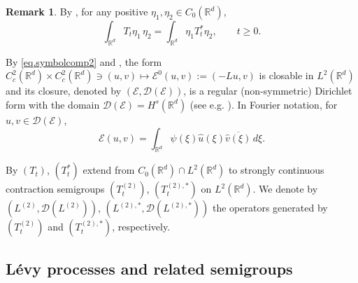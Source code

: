 \documentclass[11pt,a4paper,reqno]{amsart}
\newcommand{\EE}{{\mathcal  E}}
\theoremstyle{definition}
\newtheorem{remark}[theorem]{Remark}
\numberwithin{equation}{section}
\begin{document}
\begin{remark}
\label{rem.adj}
By \cite[Proposition II.1]{Bertoin}, for any positive $\eta_1, \eta_2 \in C_0(\mathbb R^d)$,
\begin{equation}
\label{eq.dual}
\int_{\mathbb{R}^d} T_t \eta_1 \, \eta_2 = \int_{\mathbb{R}^d} \eta_1 T^*_t \eta_2, \qquad t \geq 0.
\end{equation}
\end{remark}











By \eqref{eq.symbolcomp2} and  \cite[Theorem 3.7]{BF}, the form $C^2_c(\mathbb R^d)\times C^2_c(\mathbb R^d)\ni(u,v)\mapsto \EE^{0}(u,v):=(-Lu,v)$
is closable in $ L^2(\mathbb R^d)$ and its closure, denoted by   $(\EE,\mathscr D(\EE))$, is a regular 
(non-symmetric) Dirichlet form with the domain $\mathscr D(\EE)=H^s(\mathbb R^d)$ (see e.g. \cite{MR}).
In Fourier notation, for $u,v\in \mathscr D(\EE)$,
\begin{equation}
\label{eq.fnot}
\mathcal{E}(u, v)=\int_{\mathbb{R}^d}\psi(\xi) \widehat{u}(\xi) \overline{\widehat{v}(\xi)}\,d \xi.
\end{equation}







By \cite[Theorem I.2.8]{MR} $(T_t)$, $(T^*_t)$ extend from $C_0(\mathbb R^d)\cap L^2(\mathbb R^d)$ to 
 strongly continuous  contraction semigroups $(T_t^{(2)})$, $(T_t^{(2),*})$  on $L^2(\mathbb{R}^d)$.
We denote by $(L^{(2)}, \mathscr{D}(L^{(2)}))$, $(L^{(2),*}, \mathscr{D}(L^{(2),*}))$  the operators generated by 
$(T_t^{(2)})$ and $(T_t^{(2),*})$, respectively.






\subsection{L\'evy processes and related semigroups}
\label{sec.fprs}
\end{document}
